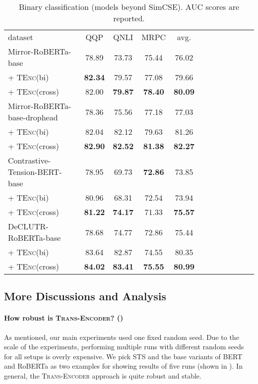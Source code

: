 \documentclass{article} \usepackage{iclr2021_conference,times}
\newcommand{\modelname}{\textsc{Trans-Encoder}\xspace}
\newcommand{\tenc}{\textsc{TEnc}\xspace}
\begin{document}
\begin{table}[!t] \centering
\small
\begin{tabular}{lccccccccccc}
\cmidrule[1.5pt]{1-10}
dataset  & QQP & QNLI & MRPC & avg.\\
\cmidrule[1.5pt]{1-10}
 Mirror-RoBERTa-base & 78.89 & 73.73 & 75.44 & 76.02 \\
 + \tenc (bi) & \textbf{82.34} & 79.57 & 77.08 & 79.66 \\
 + \tenc (cross) & 82.00 & \textbf{79.87} & \textbf{78.40} & \textbf{80.09} \\
\cmidrule[1.0pt]{1-10}
 Mirror-RoBERTa-base-drophead & 78.36 & 75.56 & 77.18 & 77.03 \\
 + \tenc (bi) & 82.04 & 82.12 & 79.63 & 81.26 \\
 + \tenc (cross) & \textbf{82.90} & \textbf{82.52} & \textbf{81.38} & \textbf{82.27} \\
 \cmidrule[1.0pt]{1-10}
Contrastive-Tension-BERT-base & 78.95 & 69.73 & \textbf{72.86} & 73.85  \\
 + \tenc (bi) & 80.96 & 68.31 & 72.54 & 73.94 \\
 + \tenc (cross) & \textbf{81.22} & \textbf{74.17} & 71.33 & \textbf{75.57}  \\
\cmidrule[1.0pt]{1-10}
DeCLUTR-RoBERTa-base  & 78.68 & 74.77 & 72.86 & 75.44 \\
 + \tenc (bi) & 83.64 & 82.87 & 74.55 & 80.35 \\
 + \tenc (cross) & \textbf{84.02} & \textbf{83.41} & \textbf{75.55} & \textbf{80.99} \\
\cmidrule[1.5pt]{1-10}
\end{tabular}
\caption{Binary classification  (models beyond SimCSE). AUC scores are reported.}
\label{tab:binary_classification_mirrorbert}
\end{table}




\subsection{More Discussions and Analysis}\label{sec:more_discuss}


\paragraph{How robust is \modelname? ()} As mentioned, our main experiments used one fixed random seed. Due to the scale of the experiments, performing multiple runs with different random seeds for all setups is overly expensive. We pick STS and the base variants of BERT and RoBERTa as two examples for showing results of five runs (shown in ). In general, the \modelname approach is quite robust and stable.
\end{document}
